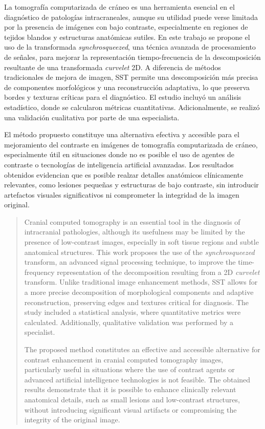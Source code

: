 \begin{resumen}
	La tomografía computarizada de cráneo es una herramienta esencial en el diagnóstico de patologías intracraneales, aunque su utilidad puede verse limitada por la presencia de imágenes con bajo contraste, especialmente en regiones de tejidos blandos y estructuras anatómicas sutiles. En este trabajo se propone el uso de la transformada \textit{synchrosqueezed}, una técnica avanzada de procesamiento de señales, para mejorar la representación tiempo-frecuencia de la descomposición resultante de una transformada \textit{curvelet} 2D. A diferencia de métodos tradicionales de mejora de imagen, SST permite una descomposición más precisa de componentes morfológicos y una reconstrucción adaptativa, lo que preserva bordes y texturas críticas para el diagnóstico.  El estudio incluyó un análisis estadístico, donde se calcularon métricas cuantitativas. Adicionalmente, se realizó una validación cualitativa por parte de una especialista.

	El método propuesto constituye una alternativa efectiva y accesible para el mejoramiento del contraste en imágenes de tomografía computarizada de cráneo, especialmente útil en situaciones donde no es posible el uso de agentes de contraste o tecnologías de inteligencia artificial avanzadas. Los resultados obtenidos evidencian que es posible realzar detalles anatómicos clínicamente relevantes, como lesiones pequeñas y estructuras de bajo contraste, sin introducir artefactos visuales significativos ni comprometer la integridad de la imagen original.
\end{resumen}

\begin{abstract}
	Cranial computed tomography is an essential tool in the diagnosis of intracranial pathologies, although its usefulness may be limited by the presence of low-contrast images, especially in soft tissue regions and subtle anatomical structures. This work proposes the use of the \textit{synchrosqueezed} transform, an advanced signal processing technique, to improve the time-frequency representation of the decomposition resulting from a 2D \textit{curvelet} transform. Unlike traditional image enhancement methods, SST allows for a more precise decomposition of morphological components and adaptive reconstruction, preserving edges and textures critical for diagnosis. The study included a statistical analysis, where quantitative metrics were calculated. Additionally, qualitative validation was performed by a specialist.

	The proposed method constitutes an effective and accessible alternative for contrast enhancement in cranial computed tomography images, particularly useful in situations where the use of contrast agents or advanced artificial intelligence technologies is not feasible. The obtained results demonstrate that it is possible to enhance clinically relevant anatomical details, such as small lesions and low-contrast structures, without introducing significant visual artifacts or compromising the integrity of the original image.
\end{abstract}
